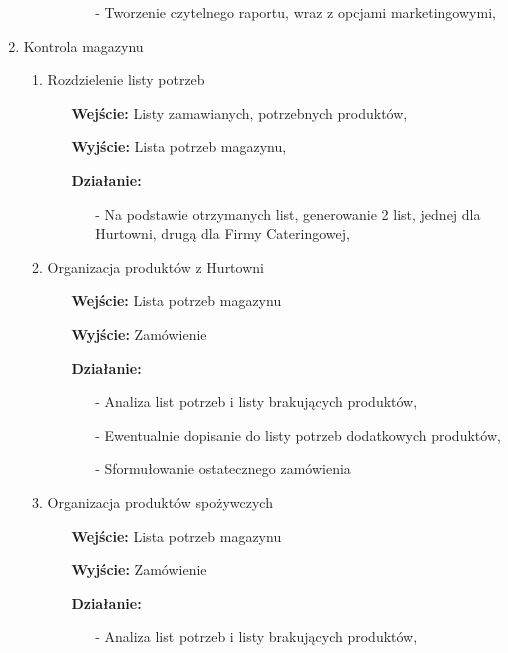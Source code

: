\documentclass[a4paper, 11pt]{article}
\begin{document}
\begin{enumerate}[label*=\arabic*.]
\begin{enumerate}[label*=\arabic*.]
\begin{itemize}
\begin{itemize}
					\item[-] Tworzenie czytelnego raportu, wraz z opcjami marketingowymi,					
				\end{itemize}
			\end{itemize}
		\end{enumerate}		
		\item Kontrola magazynu
		\begin{enumerate}[label*=\arabic*.]
			\item Rozdzielenie listy potrzeb
			\begin{itemize}
				\item [\textbf{Wejście:}] Listy zamawianych, potrzebnych produktów,
				\item [\textbf{Wyjście:}] Lista potrzeb magazynu,
				\item [\textbf{Działanie:}] 
				\begin{itemize}
					\item[-] Na podstawie otrzymanych list, generowanie 2 list, jednej dla Hurtowni, drugą dla Firmy Cateringowej,
				\end{itemize}
			\end{itemize}
			\item Organizacja produktów z Hurtowni			
			\begin{itemize}
				\item [\textbf{Wejście:}] Lista potrzeb magazynu
				\item [\textbf{Wyjście:}] Zamówienie
				\item [\textbf{Działanie:}] 
				\begin{itemize}
					\item[-] Analiza list potrzeb i listy brakujących produktów,
					\item[-] Ewentualnie dopisanie do listy potrzeb dodatkowych produktów,
					\item[-] Sformułowanie ostatecznego zamówienia
				\end{itemize}
			\end{itemize}
			\item Organizacja produktów spożywczych
			\begin{itemize}
				\item [\textbf{Wejście:}] Lista potrzeb magazynu
				\item [\textbf{Wyjście:}] Zamówienie
				\item [\textbf{Działanie:}] 
				\begin{itemize}
					\item[-] Analiza list potrzeb i listy brakujących produktów,

\end{itemize}
\end{itemize}
\end{enumerate}
\end{enumerate}
\end{document}
